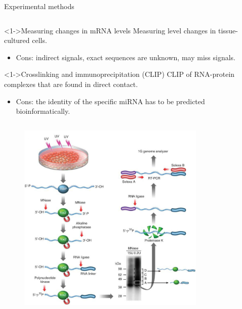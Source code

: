 \documentclass{beamer}
\begin{document}
\begin{frame}{Experimental methods}
\begin{column}{0.65\textwidth}
\begin{exampleblock}
		<1->{Measuring changes in mRNA levels}
		 Measuring level changes in tissue-cultured cells.
    \begin{itemize}
    \item Cons: indirect signals, exact sequences are unknown, may miss signals.
    \end{itemize}
	\end{exampleblock}
\begin{exampleblock}
		<1->{Crosslinking and immunoprecipitation (CLIP)}
		CLIP of RNA-protein complexes that are found in direct contact.
  \begin{itemize}
    \item Cons: the identity of the specific miRNA has to be predicted bioinformatically.
    \end{itemize}
	\end{exampleblock}
\end{column}
\begin{column}{0.35\textwidth}
\begin{figure}[hb!]
	  \centering
    \includegraphics[width=0.8\textwidth]{images/Crosslinking-and-Immunoprecipitation-(CLIP)-2.jpg}
\end{figure}
\end{column}

\end{frame}
\end{document}
